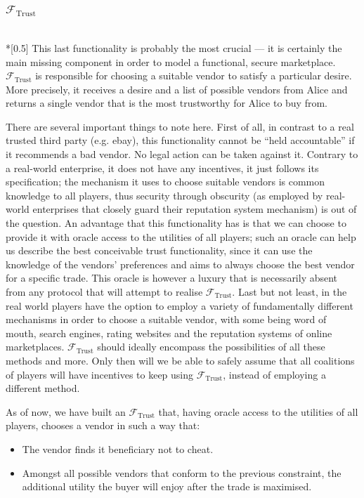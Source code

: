 \subsubsection{$\mathcal{F}_{\mathrm{Trust}}$} \ \\*[0.5\baselineskip]
  This last functionality is probably the most crucial --- it is certainly the main
  missing component in order to model a functional, secure marketplace.
  $\mathcal{F}_{\mathrm{Trust}}$ is responsible for choosing a suitable vendor to satisfy
  a particular desire. More precisely, it receives a desire and a list of possible vendors
  from Alice and returns a single vendor that is the most trustworthy for Alice to buy
  from.

  There are several important things to note here. First of all, in contrast to a real
  trusted third party (e.g. ebay), this functionality cannot be ``held accountable'' if it
  recommends a bad vendor. No legal action can be taken against it. Contrary to a
  real-world enterprise, it does not have any incentives, it just follows its
  specification; the mechanism it uses to choose suitable vendors is common knowledge to
  all players, thus security through obscurity (as employed by real-world enterprises that
  closely guard their reputation system mechanism) is out of the question. An advantage
  that this functionality has is that we can choose to provide it with oracle access to
  the utilities of all players; such an oracle can help us describe the best conceivable
  trust functionality, since it can use the knowledge of the vendors' preferences and
  aims to always choose the best vendor for a specific trade. This oracle is however a
  luxury that is necessarily absent from any protocol that will attempt to realise
  $\mathcal{F}_{\mathrm{Trust}}$. Last but not least, in the real world players have the
  option to employ a variety of fundamentally different mechanisms in order to choose a
  suitable vendor, with some being word of mouth, search engines, rating websites and the
  reputation systems of online marketplaces. $\mathcal{F}_{\mathrm{Trust}}$ should ideally
  encompass the possibilities of all these methods and more. Only then will we be able to
  safely assume that all coalitions of players will have incentives to keep using
  $\mathcal{F}_{\mathrm{Trust}}$, instead of employing a different method.

  As of now, we have built an $\mathcal{F}_{\mathrm{Trust}}$ that, having oracle access to
  the utilities of all players, chooses a vendor in such a way that:
  \begin{itemize}
    \item The vendor finds it beneficiary not to cheat.
    \item Amongst all possible vendors that conform to the previous constraint, the
    additional utility the buyer will enjoy after the trade is maximised.
  \end{itemize}
